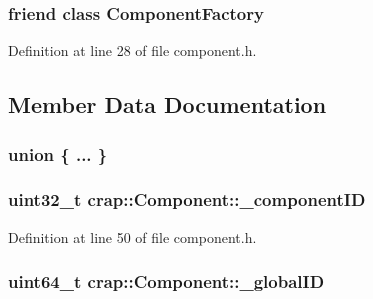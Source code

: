 \subsubsection[{Component\+Factory}]{\setlength{\rightskip}{0pt plus 5cm}friend class {\bf Component\+Factory}\hspace{0.3cm}{\ttfamily [friend]}}\label{classcrap_1_1_component_aecda75df4b9adea3627b9a501b3600a3}


Definition at line 28 of file component.\+h.



\subsection{Member Data Documentation}
\hypertarget{classcrap_1_1_component_aee0ea03b2a281b5bf5b73ea53cecbdac}{}\subsubsection[{"@25}]{\setlength{\rightskip}{0pt plus 5cm}union \{ ... \} \hspace{0.3cm}{\ttfamily [protected]}}\label{classcrap_1_1_component_aee0ea03b2a281b5bf5b73ea53cecbdac}
\hypertarget{classcrap_1_1_component_a6d9419b08a4f067e499e1519b1adb114}{}
\subsubsection[{\+\_\+component\+I\+D}]{\setlength{\rightskip}{0pt plus 5cm}uint32\+\_\+t crap\+::\+Component\+::\+\_\+component\+I\+D}\label{classcrap_1_1_component_a6d9419b08a4f067e499e1519b1adb114}


Definition at line 50 of file component.\+h.

\hypertarget{classcrap_1_1_component_ad08e115338661f499c91b24291a6718c}{}
\subsubsection[{\+\_\+global\+I\+D}]{\setlength{\rightskip}{0pt plus 5cm}uint64\+\_\+t crap\+::\+Component\+::\+\_\+global\+I\+D}\label{classcrap_1_1_component_ad08e115338661f499c91b24291a6718c}


